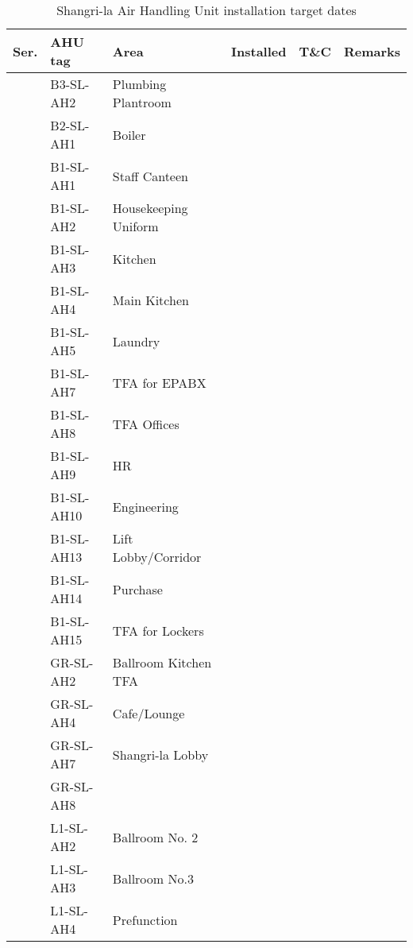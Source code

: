 \begin{table}[htbp]
\setcounter{step}{0}
\label{tbl:AHUSL}
\footnotesize
\caption{Shangri-la Air Handling Unit installation target dates}
\begin{tabular}{llp{3.2cm} c c l}
\toprule
 Ser.	 	 &AHU tag 	 &Area	 			&Installed	&T\&C &Remarks \\
\midrule

 
 \inc	 	 &B3-SL-AH2	 &Plumbing Plantroom	 	 &\checkmark	 && \\
\midrule
 \inc	 	 &B2-SL-AH1     &Boiler	 	  	 &\checkmark &&\\
 
\midrule

 \inc	 	 &B1-SL-AH1	 &Staff Canteen		  &\checkmark   && \\
 \inc	 	 &B1-SL-AH2	 &Housekeeping Uniform	  &\checkmark   && \\
 \inc	 	 &B1-SL-AH3	 &Kitchen		 	  &\checkmark   && \\
 \inc	 	 &B1-SL-AH4	 &Main Kitchen	 		  &&  & \\
 \inc	 	 &B1-SL-AH5	 &Laundry	 	 	  &\checkmark  & &\\

\inc	 	 &B1-SL-AH7    &TFA for EPABX		  &\checkmark&  & \\
\inc	 	 &B1-SL-AH8	 &TFA Offices	            	  &\checkmark&  & \\
\inc	 	 &B1-SL-AH9	 &HR	 	 		  &\checkmark  & &\\
\inc	 	 &B1-SL-AH10	 &Engineering	 	 	  &\checkmark&  & \\
 
\inc	 	 &B1-SL-AH13	 &Lift Lobby/Corridor	 	&\checkmark &  & \\
\inc	 	 &B1-SL-AH14	 &Purchase	 	 	 &\checkmark & &\\
\inc	 	 &B1-SL-AH15	 &TFA for Lockers	 	 &\checkmark & & \\

\midrule

 
\inc	 	 &GR-SL-AH2	 &Ballroom Kitchen TFA	 &\checkmark&&\\

\inc	 	 &GR-SL-AH4	 &Cafe/Lounge	 	&\checkmark &&\\
 
\inc	 	 &GR-SL-AH7	 &Shangri-la Lobby	 	&\checkmark& &\\
\inc	 	 &GR-SL-AH8	 &	 	 	 	&\checkmark & &\\
\midrule


\inc	 	 &L1-SL-AH2	 &Ballroom No. 2	 	&\checkmark  & &\\
\inc	 	 &L1-SL-AH3	 &Ballroom No.3	 	&\checkmark  & &\\
\inc	 	 &L1-SL-AH4	 &Prefunction	 	 	&\checkmark && \\
 

\end{tabular}
\end{table}
